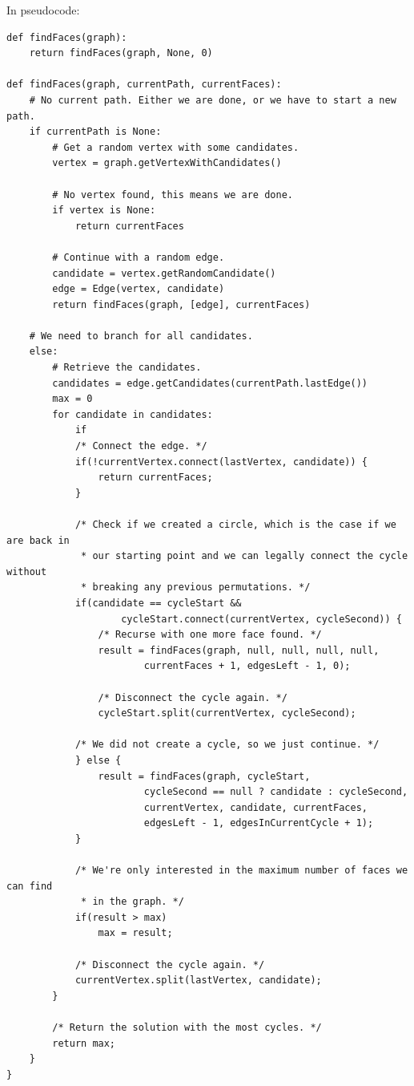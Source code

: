 \documentclass{article}
\begin{document}
In pseudocode:
\lstset{language=Python}
\begin{lstlisting}
def findFaces(graph):
    return findFaces(graph, None, 0)

def findFaces(graph, currentPath, currentFaces):
    # No current path. Either we are done, or we have to start a new path.
    if currentPath is None:
        # Get a random vertex with some candidates.
        vertex = graph.getVertexWithCandidates()

        # No vertex found, this means we are done.
        if vertex is None:
            return currentFaces

        # Continue with a random edge.
        candidate = vertex.getRandomCandidate()
        edge = Edge(vertex, candidate)
        return findFaces(graph, [edge], currentFaces)

    # We need to branch for all candidates.
    else:
        # Retrieve the candidates.
        candidates = edge.getCandidates(currentPath.lastEdge())
        max = 0
        for candidate in candidates:
            if
            /* Connect the edge. */
            if(!currentVertex.connect(lastVertex, candidate)) {
                return currentFaces;
            }

            /* Check if we created a circle, which is the case if we are back in
             * our starting point and we can legally connect the cycle without
             * breaking any previous permutations. */
            if(candidate == cycleStart &&
                    cycleStart.connect(currentVertex, cycleSecond)) {
                /* Recurse with one more face found. */
                result = findFaces(graph, null, null, null, null,
                        currentFaces + 1, edgesLeft - 1, 0);

                /* Disconnect the cycle again. */
                cycleStart.split(currentVertex, cycleSecond);

            /* We did not create a cycle, so we just continue. */
            } else {
                result = findFaces(graph, cycleStart,
                        cycleSecond == null ? candidate : cycleSecond,
                        currentVertex, candidate, currentFaces,
                        edgesLeft - 1, edgesInCurrentCycle + 1);
            }

            /* We're only interested in the maximum number of faces we can find
             * in the graph. */
            if(result > max)
                max = result;

            /* Disconnect the cycle again. */
            currentVertex.split(lastVertex, candidate);
        }

        /* Return the solution with the most cycles. */
        return max;
    }
}
\end{lstlisting}
\end{document}
